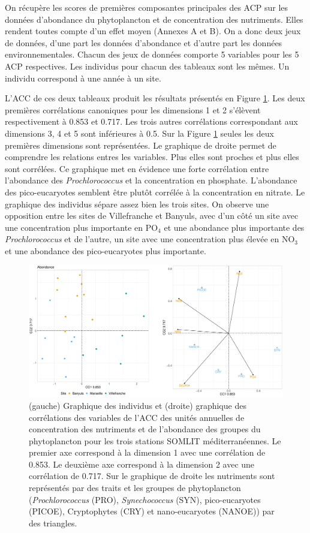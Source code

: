 \documentclass[12pt]{article}
\begin{document}
On récupère les scores de premières composantes principales des ACP sur les données d’abondance du phytoplancton et de concentration des nutriments. Elles rendent toutes compte d’un effet moyen (Annexes A et B). On a donc deux jeux de données, d’une part les données d’abondance et d’autre part les données environnementales. Chacun des jeux de données comporte 5 variables pour les 5 ACP respectives. Les individus pour chacun des tableaux sont les mêmes. Un individu correspond à une année à un site.

L’ACC de ces deux tableaux produit les résultats présentés en Figure \ref{cca_ab}. Les deux premières corrélations canoniques pour les dimensions 1 et 2 s’élèvent respectivement à 0.853 et 0.717.  Les trois autres corrélations correspondant aux dimensions 3, 4 et 5 sont inférieures à 0.5. Sur la Figure \ref{cca_ab} seules les deux premières dimensions sont représentées. Le graphique de droite permet de comprendre les relations entres les variables. Plus elles sont proches et plus elles sont corrélées. Ce graphique met en évidence une forte corrélation entre l’abondance des  \textit{Prochlorococcus} et la concentration en phosphate. L’abondance des pico-eucaryotes semblent être plutôt corrélée à la concentration en nitrate. Le graphique des individus sépare assez bien les trois sites. On observe une opposition entre les sites de Villefranche et Banyuls, avec d’un côté un site avec une concentration plus importante en PO$_4$ et une abondance plus importante des \textit{Prochlorococcus} et de l’autre, un site avec une concentration plus élevée en NO$_3$ et une abondance des pico-eucaryotes plus importante. 

\begin{figure}
\centering
\includegraphics[width=.95\textwidth]{fig/R231_CCA_ab.pdf}
\caption{(gauche) Graphique des individus et (droite) graphique des corrélations des variables de l'ACC des unités annuelles de concentration des nutriments et de l'abondance des groupes du phytoplancton pour les trois stations SOMLIT méditerranéennes. Le premier axe correspond à la dimension 1 avec une corrélation de 0.853. Le deuxième axe correspond à la dimension 2 avec une corrélation de 0.717. Sur le graphique de droite les nutriments sont représentés par des traits et les groupes de phytoplancton (\textit{Prochlorococcus} (PRO), \textit{Synechococcus} (SYN), pico-eucaryotes (PICOE), Cryptophytes (CRY) et nano-eucaryotes (NANOE)) par des triangles.}
\label{cca_ab}
\end{figure}
\end{document}
